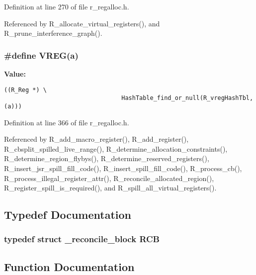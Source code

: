 Definition at line 270 of file r\_\-regalloc.h.

Referenced by R\_\-allocate\_\-virtual\_\-registers(), and R\_\-prune\_\-interference\_\-graph().
\subsubsection{\setlength{\rightskip}{0pt plus 5cm}\#define VREG(a)}\label{r__regalloc_8h_75f9e216dad7f43cfd99917d62f28c66}


\textbf{Value:}

\begin{Code}\begin{verbatim}((R_Reg *) \
                                 HashTable_find_or_null(R_vregHashTbl,(a)))
\end{verbatim}\end{Code}


Definition at line 366 of file r\_\-regalloc.h.

Referenced by R\_\-add\_\-macro\_\-register(), R\_\-add\_\-register(), R\_\-cbsplit\_\-spilled\_\-live\_\-range(), R\_\-determine\_\-allocation\_\-constraints(), R\_\-determine\_\-region\_\-flybys(), R\_\-determine\_\-reserved\_\-registers(), R\_\-insert\_\-jsr\_\-spill\_\-fill\_\-code(), R\_\-insert\_\-spill\_\-fill\_\-code(), R\_\-process\_\-cb(), R\_\-process\_\-illegal\_\-register\_\-attr(), R\_\-reconcile\_\-allocated\_\-region(), R\_\-register\_\-spill\_\-is\_\-required(), and R\_\-spill\_\-all\_\-virtual\_\-registers().

\subsection{Typedef Documentation}
\subsubsection{\setlength{\rightskip}{0pt plus 5cm}typedef struct \bf{\_\-reconcile\_\-block}  \bf{RCB}}\label{r__regalloc_8h_40b72985b838bc932888de1194075d52}




\subsection{Function Documentation}
